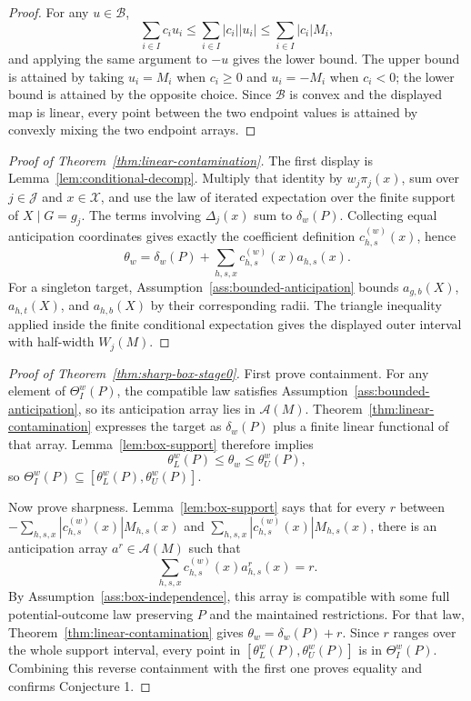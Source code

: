 \documentclass[11pt]{article}
\theoremstyle{definition}
\theoremstyle{plain}
\theoremstyle{remark}
\begin{document}
\begin{proof}
For any \(u\in\mathcal{B}\),
\[
  \sum_{i\in I}c_i u_i
  \le
  \sum_{i\in I}|c_i||u_i|
  \le
  \sum_{i\in I}|c_i|M_i,
\]
and applying the same argument to \(-u\) gives the lower bound.  The upper bound
is attained by taking \(u_i=M_i\) when \(c_i\ge0\) and \(u_i=-M_i\) when
\(c_i<0\); the lower bound is attained by the opposite choice.  Since
\(\mathcal{B}\) is convex and the displayed map is linear, every point between
the two endpoint values is attained by convexly mixing the two endpoint arrays.
\end{proof}

\begin{proof}[Proof of Theorem~\ref{thm:linear-contamination}]
The first display is Lemma~\ref{lem:conditional-decomp}.  Multiply that identity
by \(w_j\pi_j(x)\), sum over \(j\in\mathcal{J}\) and \(x\in\mathcal{X}\), and
use the law of iterated expectation over the finite support of \(X\mid G=g_j\).
The terms involving \(\Delta_j(x)\) sum to \(\delta_w(P)\).  Collecting equal
anticipation coordinates gives exactly the coefficient definition
\(c^{(w)}_{h,s}(x)\), hence
\[
  \theta_w
  =
  \delta_w(P)+\sum_{h,s,x}c^{(w)}_{h,s}(x)a_{h,s}(x).
\]
For a singleton target, Assumption~\ref{ass:bounded-anticipation} bounds
\(a_{g,b}(X)\), \(a_{h,t}(X)\), and \(a_{h,b}(X)\) by their corresponding radii.
The triangle inequality applied inside the finite conditional expectation gives
the displayed outer interval with half-width \(W_j(M)\).
\end{proof}

\begin{proof}[Proof of Theorem~\ref{thm:sharp-box-stage0}]
First prove containment.  For any element of \(\Theta_I^w(P)\), the compatible
law satisfies Assumption~\ref{ass:bounded-anticipation}, so its anticipation
array lies in \(\mathcal{A}(M)\).  Theorem~\ref{thm:linear-contamination}
expresses the target as \(\delta_w(P)\) plus a finite linear functional of that
array.  Lemma~\ref{lem:box-support} therefore implies
\[
  \theta_L^w(P)\le \theta_w\le \theta_U^w(P),
\]
so \(\Theta_I^w(P)\subseteq[\theta_L^w(P),\theta_U^w(P)]\).

Now prove sharpness.  Lemma~\ref{lem:box-support} says that for every
\(r\) between
\(-\sum_{h,s,x}|c^{(w)}_{h,s}(x)|M_{h,s}(x)\) and
\(\sum_{h,s,x}|c^{(w)}_{h,s}(x)|M_{h,s}(x)\), there is an anticipation array
\(a^r\in\mathcal{A}(M)\) such that
\[
  \sum_{h,s,x}c^{(w)}_{h,s}(x)a^r_{h,s}(x)=r.
\]
By Assumption~\ref{ass:box-independence}, this array is compatible with some
full potential-outcome law preserving \(P\) and the maintained restrictions.
For that law, Theorem~\ref{thm:linear-contamination} gives
\(\theta_w=\delta_w(P)+r\).  Since \(r\) ranges over the whole support interval,
every point in \([\theta_L^w(P),\theta_U^w(P)]\) is in
\(\Theta_I^w(P)\).  Combining this reverse containment with the first one proves
equality and confirms Conjecture 1.
\end{proof}
\end{document}
